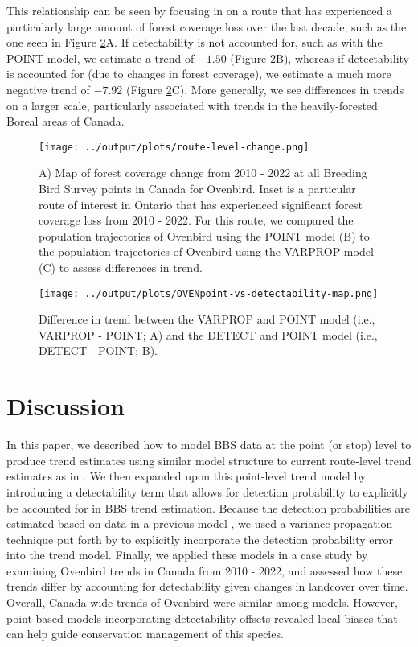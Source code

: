 \documentclass[12pt]{article}
\begin{document}
\par This relationship can be seen by focusing in on a route that has experienced a particularly large amount of forest coverage loss over the last decade, such as the one seen in Figure \ref{fig:route-change}A. 
If detectability is not accounted for, such as with the POINT model, we estimate a trend of $-1.50$ (Figure \ref{fig:route-change}B), whereas if detectability is accounted for (due to changes in forest coverage), we estimate a much more negative trend of $-7.92$ (Figure \ref{fig:route-change}C).
More generally, we see differences in trends on a larger scale, particularly associated with trends in the heavily-forested Boreal areas of Canada.

\begin{figure}[h]
	\texttt{[image: ../output/plots/route-level-change.png]}
	\caption{A) Map of forest coverage change from 2010 - 2022 at all Breeding Bird Survey points in Canada for Ovenbird. Inset is a particular route of interest in Ontario that has experienced significant forest coverage loss from 2010 - 2022. For this route, we compared the population trajectories of Ovenbird using the POINT model (B) to the population trajectories of Ovenbird using the VARPROP model (C) to assess differences in trend.}
	\label{fig:route-change}
\end{figure}

\begin{figure}[h]
	\texttt{[image: ../output/plots/OVENpoint-vs-detectability-map.png]}
	\caption{Difference in trend between the VARPROP and POINT model (i.e., VARPROP - POINT; A) and the DETECT and POINT model (i.e., DETECT - POINT; B).}
	\label{fig:route-change}
\end{figure}

\section{Discussion}

\par In this paper, we described how to model BBS data at the point (or stop) level to produce trend estimates using similar model structure to current route-level trend estimates as in \citet{smith_spatially_2023}.
We then expanded upon this point-level trend model by introducing a detectability term that allows for detection probability to explicitly be accounted for in BBS trend estimation.
Because the detection probabilities are estimated based on data in a previous model \citep{edwards_point_2023}, we used a variance propagation technique put forth by \citet{bravington_variance_2021} to explicitly incorporate the detection probability error into the trend model.
Finally, we applied these models in a case study by examining Ovenbird trends in Canada from 2010 - 2022, and assessed how these trends differ by accounting for detectability given changes in landcover over time.
Overall, Canada-wide trends of Ovenbird were similar among models.
However, point-based models incorporating detectability offsets revealed local biases that can help guide conservation management of this species.
\end{document}

